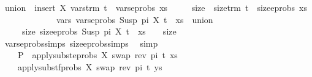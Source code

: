 \begin{isabellebody}
\ {\isacharquery}{\kern0pt}union\ {\isacharequal}{\kern0pt}\ {\isachardoublequoteopen}insert\ X\ {\isacharparenleft}{\kern0pt}vars{\isacharunderscore}{\kern0pt}trm\ t\ {\isasymunion}\ vars{\isacharunderscore}{\kern0pt}eprobs\ xs{\isacharparenright}{\kern0pt}{\isachardoublequoteclose}\isanewline
\ \ \ \ \ {\isacharquery}{\kern0pt}size\ {\isacharequal}{\kern0pt}\ {\isachardoublequoteopen}size{\isacharunderscore}{\kern0pt}trm\ t\ {\isacharplus}{\kern0pt}\ size{\isacharunderscore}{\kern0pt}eprobs\ xs{\isachardoublequoteclose}\isanewline
\ \ \ \isamarkupfalse%
\ {}\ \isamarkupfalse%
\ \isanewline
\ \ \ \ \ vars{\isacharcolon}{\kern0pt}\ {\isachardoublequoteopen}vars{\isacharunderscore}{\kern0pt}eprobs\ {\isacharparenleft}{\kern0pt}{\isacharparenleft}{\kern0pt}Susp\ pi\ X{\isacharcomma}{\kern0pt}\ t{\isacharparenright}{\kern0pt}\ {\isacharhash}{\kern0pt}\ xs{\isacharparenright}{\kern0pt}\ {\isacharequal}{\kern0pt}\ {\isacharquery}{\kern0pt}union{\isachardoublequoteclose}\ \isanewline
\ \ \ \ \ size{\isacharcolon}{\kern0pt}\ {\isachardoublequoteopen}size{\isacharunderscore}{\kern0pt}eprobs\ {\isacharparenleft}{\kern0pt}{\isacharparenleft}{\kern0pt}Susp\ pi\ X{\isacharcomma}{\kern0pt}\ t{\isacharparenright}{\kern0pt}\ {\isacharhash}{\kern0pt}\ xs{\isacharparenright}{\kern0pt}\ {\isacharequal}{\kern0pt}\ {}\ {\isacharplus}{\kern0pt}\ {\isacharquery}{\kern0pt}size{\isachardoublequoteclose}\isanewline
\ \ \ \ \isamarkupfalse%
\ vars{\isacharunderscore}{\kern0pt}eprobs{\isachardot}{\kern0pt}simps\ size{\isacharunderscore}{\kern0pt}eprobs{\isachardot}{\kern0pt}simps\ \isamarkupfalse%
\ simp{\isacharplus}{\kern0pt}\isanewline
\ \ \ \isamarkupfalse%
\ \isamarkupfalse%
\ {}\ \isamarkupfalse%
\isanewline
\ \ \ \ {\isachardoublequoteopen}P{}\ {\isacharequal}{\kern0pt}\ {\isacharparenleft}{\kern0pt}apply{\isacharunderscore}{\kern0pt}subst{\isacharunderscore}{\kern0pt}eprobs\ {\isacharbrackleft}{\kern0pt}{\isacharparenleft}{\kern0pt}X{\isacharcomma}{\kern0pt}\ swap\ {\isacharparenleft}{\kern0pt}rev\ pi{\isacharparenright}{\kern0pt}\ t{\isacharparenright}{\kern0pt}{\isacharbrackright}{\kern0pt}\ xs{\isacharcomma}{\kern0pt}\ \isanewline
\ \ \ \ apply{\isacharunderscore}{\kern0pt}subst{\isacharunderscore}{\kern0pt}fprobs\ {\isacharbrackleft}{\kern0pt}{\isacharparenleft}{\kern0pt}X{\isacharcomma}{\kern0pt}\ swap\ {\isacharparenleft}{\kern0pt}rev\ pi{\isacharparenright}{\kern0pt}\ t{\isacharparenright}{\kern0pt}{\isacharbrackright}{\kern0pt}\ ys{\isacharparenright}{\kern0pt}{\isachardoublequoteclose}\isanewline

\end{isabellebody}
